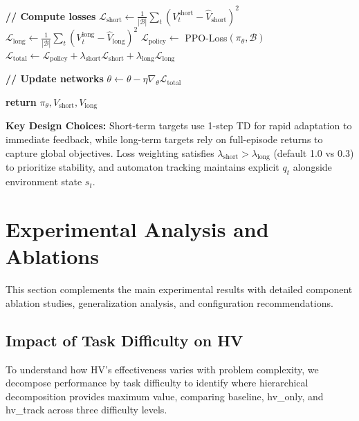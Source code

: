 \documentclass{article}
\begin{document}
\begin{algorithm}[htbp]
\begin{algorithmic}[1]
    \STATE \textbf{// Compute losses}
    \STATE $\mathcal{L}_{\text{short}} \gets \frac{1}{|\mathcal{B}|} \sum_t (V_t^{\text{short}} - \hat{V}_{\text{short}})^2$
    \STATE $\mathcal{L}_{\text{long}} \gets \frac{1}{|\mathcal{B}|} \sum_t (V_t^{\text{long}} - \hat{V}_{\text{long}})^2$
    \STATE $\mathcal{L}_{\text{policy}} \gets$ PPO-Loss$(\pi_\theta, \mathcal{B})$
    \STATE $\mathcal{L}_{\text{total}} \gets \mathcal{L}_{\text{policy}} + \lambda_{\text{short}} \mathcal{L}_{\text{short}} + \lambda_{\text{long}} \mathcal{L}_{\text{long}}$
    
    \STATE \textbf{// Update networks}
    \STATE $\theta \gets \theta - \eta \nabla_\theta \mathcal{L}_{\text{total}}$
\ENDFOR

\STATE \textbf{return} $\pi_\theta, V_{\text{short}}, V_{\text{long}}$
\end{algorithmic}
\end{algorithm}

\textbf{Key Design Choices:}
Short-term targets use 1-step TD for rapid adaptation to immediate feedback, while long-term targets rely on full-episode returns to capture global objectives. Loss weighting satisfies $\lambda_{\text{short}} > \lambda_{\text{long}}$ (default 1.0 vs 0.3) to prioritize stability, and automaton tracking maintains explicit $q_t$ alongside environment state $s_t$.


\section{Experimental Analysis and Ablations}
\label{app:experiments}

This section complements the main experimental results with detailed component ablation studies, generalization analysis, and configuration recommendations.

\subsection{Impact of Task Difficulty on HV}

To understand how HV's effectiveness varies with problem complexity, we decompose performance by task difficulty to identify where hierarchical decomposition provides maximum value, comparing baseline, hv\_only, and hv\_track across three difficulty levels.
\end{document}
